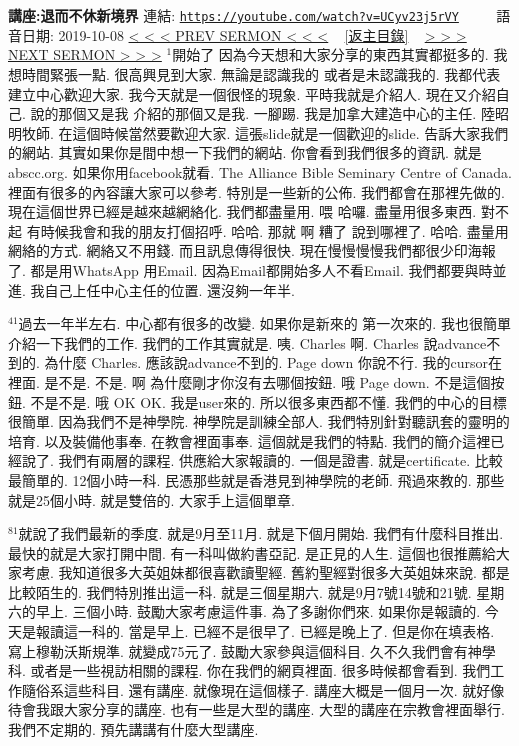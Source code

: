 \documentclass{book}
\begin{document}
\section{}
\label{sec:UCyv23j5rVY}
\textbf{講座:退而不休新境界}
\newline
\newline
連結: \href{https://youtube.com/watch?v=UCyv23j5rVY}{\texttt{https://youtube.com/watch?v=UCyv23j5rVY}} ~~~~ 語音日期: 2019-10-08
\newline
\newline
\hyperref[sec:code]{\small{< < < PREV SERMON < < <}}
~
\hyperref[sec:index]{\small{[返主目錄]}}
~
\hyperref[sec:JwFqk5bcKhM]{\small{> > > NEXT SERMON > > >}}
\newline
\newline
$^{1}$開始了 因為今天想和大家分享的東西其實都挺多的.
我想時間緊張一點.
很高興見到大家.
無論是認識我的 或者是未認識我的.
我都代表建立中心歡迎大家.
我今天就是一個很怪的現象.
平時我就是介紹人.
現在又介紹自己.
說的那個又是我 介紹的那個又是我.
一腳踢.
我是加拿大建造中心的主任.
陸昭明牧師.
在這個時候當然要歡迎大家.
這張slide就是一個歡迎的slide.
告訴大家我們的網站.
其實如果你是間中想一下我們的網站.
你會看到我們很多的資訊.
就是abscc.org.
如果你用facebook就看.
The Alliance Bible Seminary Centre of Canada.
裡面有很多的內容讓大家可以參考.
特別是一些新的公佈.
我們都會在那裡先做的.
現在這個世界已經是越來越網絡化.
我們都盡量用.
喂 哈囉.
盡量用很多東西.
對不起 有時候我會和我的朋友打個招呼.
哈哈.
那就 啊 糟了 說到哪裡了.
哈哈.
盡量用網絡的方式.
網絡又不用錢.
而且訊息傳得很快.
現在慢慢慢慢我們都很少印海報了.
都是用WhatsApp 用Email.
因為Email都開始多人不看Email.
我們都要與時並進.
我自己上任中心主任的位置.
還沒夠一年半.

$^{41}$過去一年半左右.
中心都有很多的改變.
如果你是新來的 第一次來的.
我也很簡單介紹一下我們的工作.
我們的工作其實就是.
咦.
Charles 啊.
Charles 說advance不到的.
為什麼 Charles.
應該說advance不到的.
Page down 你說不行.
我的cursor在裡面.
是不是.
不是.
啊 為什麼剛才你沒有去哪個按鈕.
哦 Page down.
不是這個按鈕.
不是不是.
哦 OK OK.
我是user來的.
所以很多東西都不懂.
我們的中心的目標很簡單.
因為我們不是神學院.
神學院是訓練全部人.
我們特別針對聽訊套的靈明的培育.
以及裝備他事奉.
在教會裡面事奉.
這個就是我們的特點.
我們的簡介這裡已經說了.
我們有兩層的課程.
供應給大家報讀的.
一個是證書.
就是certificate.
比較最簡單的.
12個小時一科.
民憑那些就是香港見到神學院的老師.
飛過來教的.
那些就是25個小時.
就是雙倍的.
大家手上這個單章.

$^{81}$就說了我們最新的季度.
就是9月至11月.
就是下個月開始.
我們有什麼科目推出.
最快的就是大家打開中間.
有一科叫做約書亞記.
是正見的人生.
這個也很推薦給大家考慮.
我知道很多大英姐妹都很喜歡讀聖經.
舊約聖經對很多大英姐妹來說.
都是比較陌生的.
我們特別推出這一科.
就是三個星期六.
就是9月7號14號和21號.
星期六的早上.
三個小時.
鼓勵大家考慮這件事.
為了多謝你們來.
如果你是報讀的.
今天是報讀這一科的.
當是早上.
已經不是很早了.
已經是晚上了.
但是你在填表格.
寫上穆勒沃斯規準.
就變成75元了.
鼓勵大家參與這個科目.
久不久我們會有神學科.
或者是一些視訪相關的課程.
你在我們的網頁裡面.
很多時候都會看到.
我們工作隨俗系這些科目.
還有講座.
就像現在這個樣子.
講座大概是一個月一次.
就好像待會我跟大家分享的講座.
也有一些是大型的講座.
大型的講座在宗教會裡面舉行.
我們不定期的.
預先講講有什麼大型講座.
\end{document}
